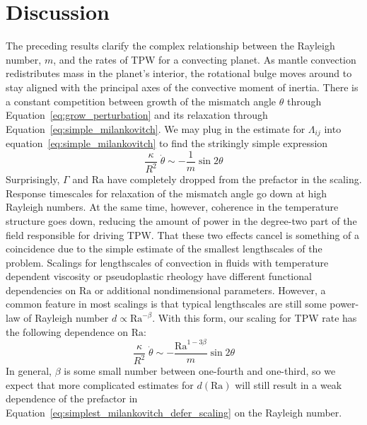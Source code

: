 \documentclass[extra,mreferee]{gji}
\begin{document}
\section{Discussion}
\label{sec:discussion}

The preceding results clarify the complex relationship between the Rayleigh number, $m$, and the rates of TPW for a convecting planet.
As mantle convection redistributes mass in the planet's interior, the rotational bulge moves around to stay aligned with the principal axes of the convective moment of inertia. 
There is a constant competition between growth of the mismatch angle $\theta$ through 
Equation~\eqref{eq:grow_perturbation} and its relaxation through Equation~\eqref{eq:simple_milankovitch}.
We may plug in the estimate for $\Lambda_{ij}$ into equation~\eqref{eq:simple_milankovitch} to find the strikingly simple expression
\begin{equation}
\frac{\kappa}{R^2} \; \dot{\theta} \sim -\frac{1}{m} \sin{2 \theta}
\label{eq:simplest_milankovitch}
\end{equation}
Surprisingly, $\Gamma$ and $\mathrm{Ra}$ have completely dropped from the prefactor in the scaling. 
Response timescales for relaxation of the mismatch angle go down at high Rayleigh numbers.
At the same time, however, coherence in the temperature structure goes down, reducing the amount of power in the degree-two part of the field responsible for driving TPW.
That these two effects cancel is something of a coincidence due to the simple estimate of the smallest lengthscales of the problem.
Scalings for lengthscales of convection in fluids with temperature dependent viscosity \citep[e.g.][]{solomatov1995scaling} or pseudoplastic rheology \citep[e.g.][]{korenaga2010scaling} have different functional dependencies on $\mathrm{Ra}$ or additional nondimensional parameters.
However, a common feature in most scalings is that typical lengthscales are still some power-law of Rayleigh number $d \propto \mathrm{Ra}^{-\beta}$.
With this form, our scaling for TPW rate has the following dependence on $\mathrm{Ra}$:
\begin{equation}
\frac{\kappa}{R^2} \; \dot{\theta} \sim -\frac{\mathrm{Ra}^{1-3\beta}}{m} \sin{2 \theta}
\label{eq:simplest_milankovitch_defer_scaling}
\end{equation}
In general, $\beta$ is some small number between one-fourth and one-third, so we expect that more complicated estimates for 
$d(\mathrm{Ra})$ will still result in a weak dependence of the prefactor in Equation~\eqref{eq:simplest_milankovitch_defer_scaling} 
on the Rayleigh number.
\end{document}
